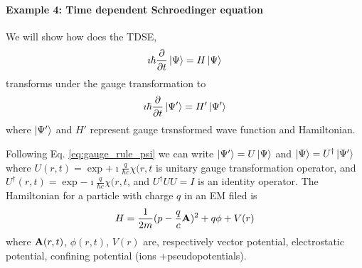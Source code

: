 \documentclass[11pt]{article}
\begin{document}
\paragraph{Example 4: Time dependent Schroedinger equation}

We will  show  how does the  TDSE, 
\begin{equation} 
    \imath \hbar \pdv{}{t} \ket{\Psi}  = H \ket{\Psi} \label{eq:tdse}
\end{equation} 
transforms  under the  gauge transformation to 
\begin{equation} 
    \imath \hbar \pdv{}{t} \ket{\Psi'}  = H' \ket{\Psi'} \label{eq:tdse_gauge}
\end{equation}
where $\ket{\Psi'}$  and $H'$ represent  gauge trsnsformed  wave function and Hamiltonian.

Following Eq. \ref{eq:gauge_rule_psi}  we  can write  $\ket{\Psi'}= U \ket{\Psi}$ 
and  $\ket{\Psi}= U^\dag \ket{\Psi'}$ 
where  $U(r,t) = \exp{ +\imath \frac{q}{\hbar c} \chi(r,t}$ is  unitary gauge transformation  operator, and $U^\dag(r,t) = \exp{ -\imath \frac{q}{\hbar c} \chi(r,t}$, and $U^\dag U U= I$ is an identity operator.  
The Hamiltonian for a particle with charge $q$ in an EM filed is
\begin{align}
    H = \frac{1}{2m}(p- \frac{q}{c} \vb A)^2 +q \phi +V(r)
    \label{eq:hamiltonian_EM}
\end{align}
where $\vb A(r,t)$, $\phi(r,t)$, $V(r)$ are, respectively  vector potential, electrostatic potential,  confining potential (ions +pseudopotentials).
\end{document}

